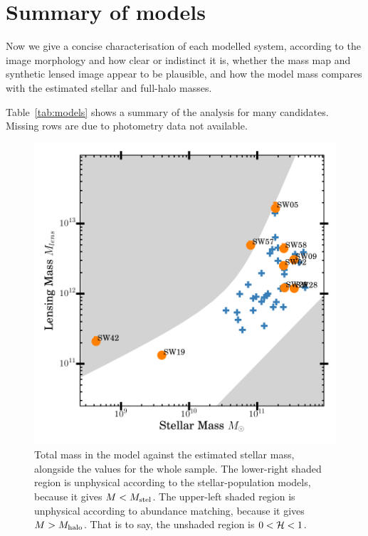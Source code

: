 \section{Summary of models}

Now we give a concise characterisation of each modelled system,
according to the image morphology and how clear or indistinct it is,
whether the mass map and synthetic lensed image appear to be
plausible, and how the model mass compares with the estimated stellar
and full-halo masses.

Table~\ref{tab:models} shows a summary of the analysis for many candidates.
Missing rows are due to photometry data not available.


\begin{figure}
\includegraphics[width=\linewidth]{img/mlens_vs_mstel_one/mstel_vs_mtot_one}
\caption{Total mass in the model against the estimated stellar mass,
  alongside the values for the whole sample.  The lower-right shaded
  region is unphysical according to the stellar-population models,
  because it gives $M<M_\text{stel}$. The upper-left shaded region is
  unphysical according to abundance matching, because it gives
  $M>M_\text{halo}$.  That is to say, the unshaded region is
  $0<\mathcal{H}<1$. \label{fig:stelmass}}
\end{figure}

